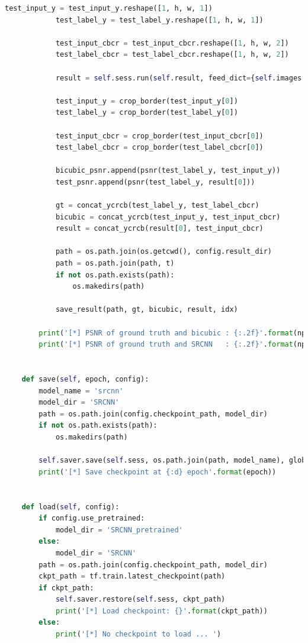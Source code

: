 \documentclass[11pt,UTF8]{ctexart}
\begin{document}
\begin{lstlisting}[language={python}]
            test_input_y = test_input_y.reshape([1, h, w, 1])
            test_label_y = test_label_y.reshape([1, h, w, 1])

            test_input_cbcr = test_input_cbcr.reshape([1, h, w, 2])
            test_label_cbcr = test_label_cbcr.reshape([1, h, w, 2])

            result = self.sess.run(self.result, feed_dict={self.images: test_input_y, self.labels: test_label_y})
                
            test_input_y = crop_border(test_input_y[0])
            test_label_y = crop_border(test_label_y[0])

            test_input_cbcr = crop_border(test_input_cbcr[0])
            test_label_cbcr = crop_border(test_label_cbcr[0])

            bicubic_psnr.append(psnr(test_label_y, test_input_y))
            test_psnr.append(psnr(test_label_y, result[0]))

            gt = concat_ycrcb(test_label_y, test_label_cbcr)
            bicubic = concat_ycrcb(test_input_y, test_input_cbcr)
            result = concat_ycrcb(result[0], test_input_cbcr)
            
            path = os.path.join(os.getcwd(), config.result_dir)
            path = os.path.join(path, t)
            if not os.path.exists(path):
                os.makedirs(path)

            save_result(path, gt, bicubic, result, idx)
            
        print('[*] PSNR of ground truth and bicubic : {:.2f}'.format(np.mean(bicubic_psnr)))
        print('[*] PSNR of ground truth and SRCNN   : {:.2f}'.format(np.mean(test_psnr)))

        
    def save(self, epoch, config):
        model_name = 'srcnn'
        model_dir = 'SRCNN'
        path = os.path.join(config.checkpoint_path, model_dir)
        if not os.path.exists(path):
            os.makedirs(path)
        
        self.saver.save(self.sess, os.path.join(path, model_name), global_step=epoch)
        print('[*] Save checkpoint at {:d} epoch'.format(epoch))


    def load(self, config):
        if config.use_pretrained:
            model_dir = 'SRCNN_pretrained'
        else:
            model_dir = 'SRCNN'
        path = os.path.join(config.checkpoint_path, model_dir)
        ckpt_path = tf.train.latest_checkpoint(path)
        if ckpt_path:
            self.saver.restore(self.sess, ckpt_path)
            print('[*] Load checkpoint: {}'.format(ckpt_path))
        else:
            print('[*] No checkpoint to load ... ')
        
	\end{lstlisting}
	
\end{document}
